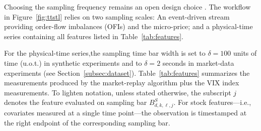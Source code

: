 \documentclass[10pt,a4paper,oneside]{article}
\begin{document}
Choosing the sampling frequency remains an open design choice \cite{dutta2023review}. The workflow in Figure~\ref{fig:ttstl} relies on two sampling scales: An event-driven stream providing order-flow imbalances (OFIs) and the micro-price; and a physical-time series containing all features listed in Table~\ref{tab:features}.

For the physical-time series,the sampling time bar width is set to $\delta=100$ units of time (u.o.t.) in synthetic experiments and to $\delta=2$ seconds in market-data experiments (see Section~\ref{subsec:dataset}). Table~\ref{tab:features} summarizes the measurements produced by the market-replay algorithm plus the VIX index measurements. To lighten notation, unless stated otherwise, the subscript $j$ denotes the feature evaluated on sampling bar $B^{S}_{d,k,\ell,j}$. For stock features—i.e., covariates measured at a single time point—the observation is timestamped at the right endpoint of the corresponding sampling bar.






\end{document}
